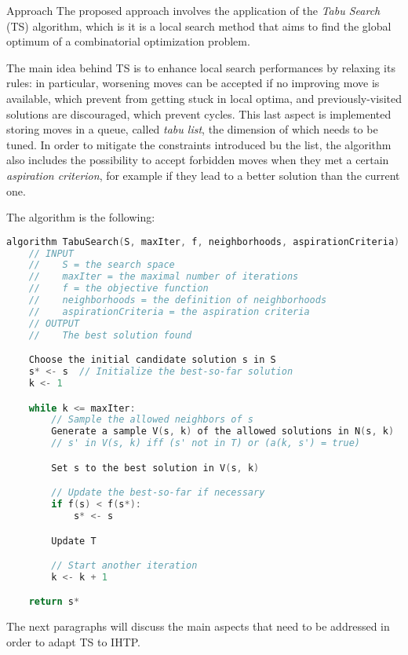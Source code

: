 \begin{section}
 {Approach}
 The proposed approach involves the application of the \textit{Tabu Search} (TS) algorithm, which is
 it is a local search method that aims to find the global optimum of a combinatorial optimization problem. \cite{ts}


 The main idea behind TS is to enhance local search performances by relaxing its rules: in particular,
 worsening moves can be accepted if no improving move is available, which prevent from getting stuck in local optima,
 and previously-visited solutions are discouraged, which prevent cycles.
 This last aspect is
 implemented storing moves in a queue, called \textit{tabu list}, the dimension of which needs to be tuned.
 In order to mitigate the constraints introduced bu the list, the algorithm also includes the possibility
 to accept forbidden moves when they met a certain \textit{aspiration criterion}, for example if they lead to
 a better solution than the current one.

 The algorithm is the following:
\begin{lstlisting}[language=c]
    algorithm TabuSearch(S, maxIter, f, neighborhoods, aspirationCriteria):
    // INPUT
    //    S = the search space
    //    maxIter = the maximal number of iterations
    //    f = the objective function
    //    neighborhoods = the definition of neighborhoods
    //    aspirationCriteria = the aspiration criteria
    // OUTPUT
    //    The best solution found

    Choose the initial candidate solution s in S
    s* <- s  // Initialize the best-so-far solution
    k <- 1

    while k <= maxIter:
        // Sample the allowed neighbors of s
        Generate a sample V(s, k) of the allowed solutions in N(s, k)
        // s' in V(s, k) iff (s' not in T) or (a(k, s') = true)

        Set s to the best solution in V(s, k)

        // Update the best-so-far if necessary
        if f(s) < f(s*):
            s* <- s

        Update T

        // Start another iteration
        k <- k + 1

    return s*
\end{lstlisting}


 The next paragraphs will discuss the main aspects that need to be addressed in order to adapt TS to IHTP.



\end{section}

